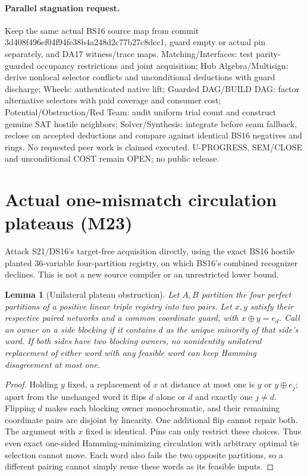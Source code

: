 \documentclass[11pt]{article}
\newtheorem{lemma}[theorem]{Lemma}
\begin{document}
\paragraph{Parallel stagnation request.}
Keep the same actual BS16 source map from commit 3d408f496ef04f94fe38b4a248d2c77b27c8dcc1, guard empty or actual pin separately, and DA17 witness/trace maps. Matching/Interfaces: test parity-guarded occupancy restrictions and joint acquisition; Hub Algebra/Multisign: derive nonlocal selector conflicts and unconditional deductions with guard discharge; Wheels: authenticated native lift; Guarded DAG/BUILD DAG: factor alternative selectors with paid coverage and consumer cost; Potential/Obstruction/Red Team: audit uniform trial count and construct genuine SAT hostile neighbors; Solver/Synthesis: integrate before seam fallback, reclose on accepted deductions and compare against identical BS16 negatives and rings. No requested peer work is claimed executed. U-PROGRESS, SEM/CLOSE and unconditional COST remain OPEN; no public release.


\section{Actual one-mismatch circulation plateaus (M23)}\label{sec:m23}
Attack S21/DS16's target-free acquisition directly, using the exact BS16 hostile planted 36-variable four-partition registry, on which BS16's combined recognizer declines. This is not a new source compiler or an unrestricted lower bound.

\begin{lemma}[Unilateral plateau obstruction]\label{lem:m23-unilateral}
Let $A,B$ partition the four perfect partitions of a positive linear triple registry into two pairs. Let $x,y$ satisfy their respective paired networks and a common coordinate guard, with $x\oplus y=e_d$. Call an owner on a side blocking if it contains $d$ as the unique minority of that side's word. If both sides have two blocking owners, no nonidentity unilateral replacement of either word with any feasible word can keep Hamming disagreement at most one.
\end{lemma}
\begin{proof}
Holding $y$ fixed, a replacement of $x$ at distance at most one is $y$ or $y\oplus e_j$; apart from the unchanged word it flips $d$ alone or $d$ and exactly one $j\ne d$. Flipping $d$ makes each blocking owner monochromatic, and their remaining coordinate pairs are disjoint by linearity. One additional flip cannot repair both. The argument with $x$ fixed is identical. Pins can only restrict these choices. Thus even exact one-sided Hamming-minimizing circulation with arbitrary optimal tie selection cannot move. Each word also fails the two opposite partitions, so a different pairing cannot simply reuse these words as its feasible inputs.
\end{proof}
\end{document}
